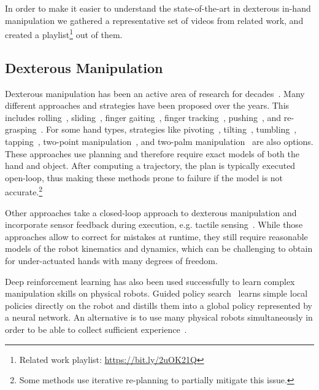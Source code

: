 In order to make it easier to understand the state-of-the-art in dexterous in-hand manipulation
we gathered a representative set of videos from related work, and created a playlist\footnote{Related work playlist: \url{https://bit.ly/2uOK21Q}} out of them.


\subsection{Dexterous Manipulation}

Dexterous manipulation has been an active area of research for decades~\citep{DBLP:conf/icra/Fearing86, DBLP:journals/ijrr/Rus99,DBLP:journals/trob/Bicchi00, DBLP:conf/icra/OkamuraSC00, DBLP:conf/icar/MaD11}.
Many different approaches and strategies have been proposed over the years.
This includes rolling~\citep{DBLP:conf/icra/BicchiS95, DBLP:conf/icra/HanGLQT97, DBLP:conf/icra/HanT98, DBLP:journals/trob/CherifG99, DBLP:conf/icra/DoulgeriD13}, sliding~\citep{DBLP:journals/trob/CherifG99, DBLP:journals/trob/ShiWUL17}, finger gaiting~\citep{DBLP:conf/icra/HanT98}, finger tracking~\citep{DBLP:conf/icra/Rus92}, pushing~\citep{DBLP:journals/corr/DafleR17}, and re-grasping~\citep{DBLP:conf/icra/TournassoudLM87, DBLP:conf/icra/DafleRPTSEMLSF14}.
For some hand types, strategies like pivoting~\citep{DBLP:conf/iros/AiyamaII93}, tilting~\citep{DBLP:journals/trob/ErdmannM88}, tumbling~\citep{sawasaki1991tumbling}, tapping~\citep{DBLP:journals/ijrr/HuangM00}, two-point manipulation~\citep{DBLP:conf/iros/AbellE95}, and two-palm manipulation~\citep{DBLP:journals/ijrr/Erdmann98} are also options.
These approaches use planning and therefore require exact models of both the hand and object.
After computing a trajectory, the plan is typically executed open-loop, thus making these methods prone to failure if the model is not accurate.\footnote{Some methods use iterative re-planning to partially mitigate this issue.}

Other approaches take a closed-loop approach to dexterous manipulation and incorporate sensor feedback during execution, e.g. tactile sensing~\citep{DBLP:conf/icra/TaharaAY10, DBLP:conf/iros/LiBKB14, DBLP:conf/icra/LiYTB14, DBLP:journals/ijma/0001MHRB13}.
While those approaches allow to correct for mistakes at runtime, they still require reasonable models of the robot kinematics and dynamics, which can be challenging to obtain for under-actuated hands with many degrees of freedom.

Deep reinforcement learning has also been used successfully to learn complex manipulation skills on physical robots.
Guided policy search~\citep{DBLP:conf/icml/LevineK13, DBLP:conf/icra/LevineWA15} learns simple local policies directly on the robot and distills them into a global policy represented by a neural network.
An alternative is to use many physical robots simultaneously in order to be able to collect sufficient experience~\citep{DBLP:conf/icra/GuHLL17, DBLP:journals/ijrr/LevinePKIQ18, 2018arXiv180610293K}.

